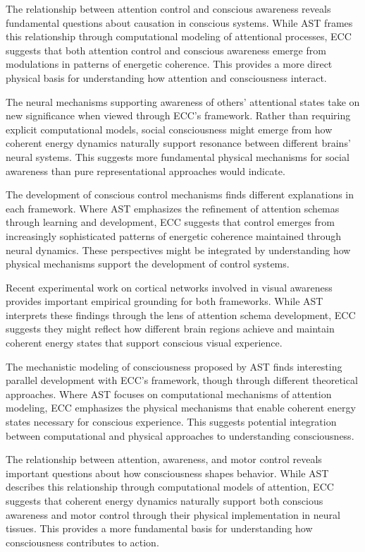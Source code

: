 \begin{refsection}
The relationship between attention control and conscious awareness \cite{WebbKemper2020} reveals fundamental questions about causation in conscious systems. While AST frames this relationship through computational modeling of attentional processes, ECC suggests that both attention control and conscious awareness emerge from modulations in patterns of energetic coherence. This provides a more direct physical basis for understanding how attention and consciousness interact.

The neural mechanisms supporting awareness of others' attentional states \cite{Kelly2014} take on new significance when viewed through ECC's framework. Rather than requiring explicit computational models, social consciousness might emerge from how coherent energy dynamics naturally support resonance between different brains' neural systems. This suggests more fundamental physical mechanisms for social awareness than pure representational approaches would indicate.

The development of conscious control mechanisms \cite{Graziano2011} finds different explanations in each framework. Where AST emphasizes the refinement of attention schemas through learning and development, ECC suggests that control emerges from increasingly sophisticated patterns of energetic coherence maintained through neural dynamics. These perspectives might be integrated by understanding how physical mechanisms support the development of control systems.

Recent experimental work on cortical networks involved in visual awareness \cite{Webb2016} provides important empirical grounding for both frameworks. While AST interprets these findings through the lens of attention schema development, ECC suggests they might reflect how different brain regions achieve and maintain coherent energy states that support conscious visual experience.

The mechanistic modeling of consciousness proposed by AST \cite{Kelly2016} finds interesting parallel development with ECC's framework, though through different theoretical approaches. Where AST focuses on computational mechanisms of attention modeling, ECC emphasizes the physical mechanisms that enable coherent energy states necessary for conscious experience. This suggests potential integration between computational and physical approaches to understanding consciousness.

The relationship between attention, awareness, and motor control \cite{Graziano2002} reveals important questions about how consciousness shapes behavior. While AST describes this relationship through computational models of attention, ECC suggests that coherent energy dynamics naturally support both conscious awareness and motor control through their physical implementation in neural tissues. This provides a more fundamental basis for understanding how consciousness contributes to action.


\end{refsection}
